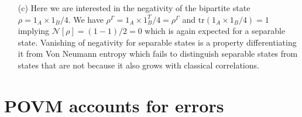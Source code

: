 \documentclass[10pt, a4paper]{article}
\begin{document}
{\begin{enumerate}
\begin{align*}
    \frac{1}{2}
    \begin{pmatrix}
      1 & 0 & 0 & 0\\
      0 & 0 & 1 & 0\\
      0 & 1 & 0 & 0\\
      0 & 0 & 0 & 1
    \end{pmatrix}
    \frac{1}{2}
    \begin{pmatrix}
      1 & 0 & 0 & 0\\
      0 & 0 & 1 & 0\\
      0 & 1 & 0 & 0\\
      0 & 0 & 0 & 1
    \end{pmatrix}
    \right)^{1/2}\right)
    =
    \frac{1}{2}\text{tr}\left(
    \begin{pmatrix}
      1 & 0 & 0 & 0\\
      0 & 1 & 0 & 0\\
      0 & 0 & 1 & 0\\
      0 & 0 & 0 & 1
    \end{pmatrix}^{1/2}\right) = 2
  \end{align*}
  leading to a negativity $\mathcal{N}[\rho] = (2-1)/2 = 1/2$ which is half of the concurrence calculated for the same state in (a) as expected of a two-qubit system. Repeating the calculation for the state $\rho = \ket{00}\bra{00}$, we find $\rho^\Gamma = \rho$ and $\text{tr}(\sqrt{\ket{00}\bra{00} (\ket{00}\bra{00})^{\dagger}}) = 1  + 0 \times 3$ leading to the negativity $\mathcal{N}[\rho] = (1-1)/2 = 0$ as expected for a separable state. 
  \item[(c)] Here we are interested in the negativity of the bipartite state $\rho = 1_A \times 1_B/4$. We have $\rho^\Gamma = 1_A \times 1_B^T/4 = \rho^\Gamma$ and $\text{tr}(1_A \times 1_B/4) = 1$ implying $\mathcal{N}[\rho] = (1-1)/2 = 0$ which is again expected for a separable state. Vanishing of negativity for separable states is a property differentiating it from Von Neumann entropy which fails to distinguish separable states from states that are not because it also grows with classical correlations. 
\end{enumerate}

\section{POVM accounts for errors}

}
\end{document}
